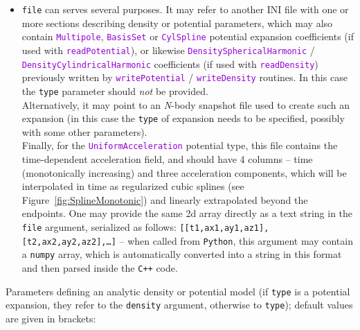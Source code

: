 \documentclass[12pt]{article}
\newcommand{\Nbody}{\textsl{N}-body\xspace}
\newcommand{\Cpp}  {\texttt{C++}\xspace}
\newcommand{\Python}{\texttt{Python}\xspace}
\newcommand{\ttt}[1]{\textcolor{darkviolet}{\texttt{#1}}}
\newcommand{\ppp}[1]{\textcolor{darkolive} {\texttt{#1}}}
\begin{document}
\begin{itemize}
\item \ppp{file} can serves several purposes. It may refer to another INI file with one or more sections describing density or potential parameters, which may also contain \ttt{Multipole}, \ttt{BasisSet} or \ttt{CylSpline} potential expansion coefficients (if used with \ttt{readPotential}), or likewise \ttt{DensitySphericalHarmonic} / \ttt{DensityCylindricalHarmonic} coefficients (if used with \ttt{readDensity}) previously written by \ttt{writePotential} / \ttt{writeDensity} routines. In this case the \ppp{type} parameter should \emph{not} be provided.\\ Alternatively, it may point to an \Nbody snapshot file used to create such an expansion (in this case the \ppp{type} of expansion needs to be specified, possibly with some other parameters).\\ Finally, for the \ttt{UniformAcceleration} potential type, this file contains the time-dependent acceleration field, and should have 4 columns -- time (monotonically increasing) and three acceleration components, which will be interpolated in time as regularized cubic splines (see Figure~\ref{fig:SplineMonotonic}) and linearly extrapolated beyond the endpoints.  One may provide the same 2d array directly as a text string in the \ppp{file} argument, serialized as follows: \texttt{[[t1,ax1,ay1,az1],[t2,ax2,ay2,az2],\dots]} -- when called from \Python, this argument may contain a \texttt{numpy} array, which is automatically converted into a string in this format and then parsed inside the \Cpp code.
\end{itemize}
Parameters defining an analytic density or potential model (if \ppp{type} is a potential expansion, they refer to the \ppp{density} argument, otherwise to \ppp{type}); default values are given in brackets:
\end{document}
